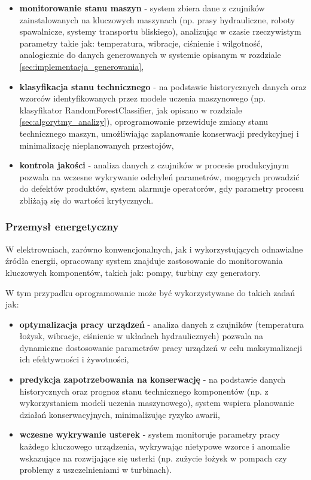 \begin{itemize}
    \item \textbf{monitorowanie stanu maszyn} - system zbiera dane z czujników zainstalowanych na kluczowych maszynach (np. prasy hydrauliczne, roboty spawalnicze, systemy transportu bliskiego),
    analizując w czasie rzeczywistym parametry takie jak: temperatura, wibracje, ciśnienie i wilgotność, analogicznie do danych generowanych w systemie opisanym w rozdziale \ref{sec:implementacja_generowania},
    \item \textbf{klasyfikacja stanu technicznego} - na podstawie historycznych danych oraz wzorców identyfikowanych przez modele uczenia maszynowego (np. klasyfikator RandomForestClassifier, jak opisano w rozdziale \ref{sec:algorytmy_analizy}), oprogramowanie przewiduje zmiany stanu technicznego maszyn,
    umożliwiając zaplanowanie konserwacji predykcyjnej i minimalizację nieplanowanych przestojów,
    \item \textbf{kontrola jakości} - analiza danych z czujników w procesie produkcyjnym pozwala na wczesne wykrywanie odchyleń parametrów, mogących prowadzić do defektów
    produktów, system alarmuje operatorów, gdy parametry procesu zbliżają się do wartości krytycznych.
\end{itemize}

\subsubsection{Przemysł energetyczny}
\label{subsubsec:przemysl_energetyczny}

W elektrowniach, zarówno konwencjonalnych, jak i wykorzystujących odnawialne źródła energii, opracowany system znajduje zastosowanie do monitorowania kluczowych komponentów, takich jak: pompy, turbiny czy generatory. 

\vspace{0.3em}

W tym przypadku oprogramowanie może być wykorzystywane do takich zadań jak:

\begin{itemize}
    \item \textbf{optymalizacja pracy urządzeń} - analiza danych z czujników (temperatura łożysk, wibracje, ciśnienie w układach hydraulicznych) pozwala na dynamiczne dostosowanie parametrów pracy urządzeń w celu maksymalizacji ich efektywności i żywotności,
    \item \textbf{predykcja zapotrzebowania na konserwację} - na podstawie danych historycznych oraz prognoz stanu technicznego komponentów (np. z wykorzystaniem modeli uczenia maszynowego), system wspiera planowanie działań konserwacyjnych, minimalizując ryzyko awarii,
    \item \textbf{wczesne wykrywanie usterek} - system monitoruje parametry pracy każdego kluczowego urządzenia, wykrywając nietypowe wzorce i anomalie wskazujące na rozwijające się usterki (np. zużycie łożysk w pompach czy problemy z uszczelnieniami w turbinach).
\end{itemize}

